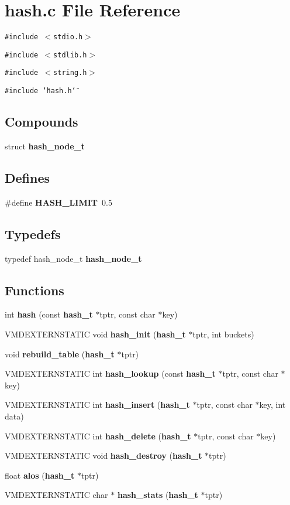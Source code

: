 \section{hash.c File Reference}
\label{hash_8c}
{\tt \#include $<$stdio.h$>$}\par
{\tt \#include $<$stdlib.h$>$}\par
{\tt \#include $<$string.h$>$}\par
{\tt \#include \char`\"{}hash.h\char`\"{}}\par
\subsection*{Compounds}
\begin{CompactItemize}
\item 
struct {\bf hash\_\-node\_\-t}
\end{CompactItemize}
\subsection*{Defines}
\begin{CompactItemize}
\item 
\#define {\bf HASH\_\-LIMIT}\ 0.5
\end{CompactItemize}
\subsection*{Typedefs}
\begin{CompactItemize}
\item 
typedef hash\_\-node\_\-t {\bf hash\_\-node\_\-t}
\end{CompactItemize}
\subsection*{Functions}
\begin{CompactItemize}
\item 
int {\bf hash} (const {\bf hash\_\-t} $\ast$tptr, const char $\ast$key)
\item 
VMDEXTERNSTATIC void {\bf hash\_\-init} ({\bf hash\_\-t} $\ast$tptr, int buckets)
\item 
void {\bf rebuild\_\-table} ({\bf hash\_\-t} $\ast$tptr)
\item 
VMDEXTERNSTATIC int {\bf hash\_\-lookup} (const {\bf hash\_\-t} $\ast$tptr, const char $\ast$key)
\item 
VMDEXTERNSTATIC int {\bf hash\_\-insert} ({\bf hash\_\-t} $\ast$tptr, const char $\ast$key, int data)
\item 
VMDEXTERNSTATIC int {\bf hash\_\-delete} ({\bf hash\_\-t} $\ast$tptr, const char $\ast$key)
\item 
VMDEXTERNSTATIC void {\bf hash\_\-destroy} ({\bf hash\_\-t} $\ast$tptr)
\item 
float {\bf alos} ({\bf hash\_\-t} $\ast$tptr)
\item 
VMDEXTERNSTATIC char $\ast$ {\bf hash\_\-stats} ({\bf hash\_\-t} $\ast$tptr)
\end{CompactItemize}


